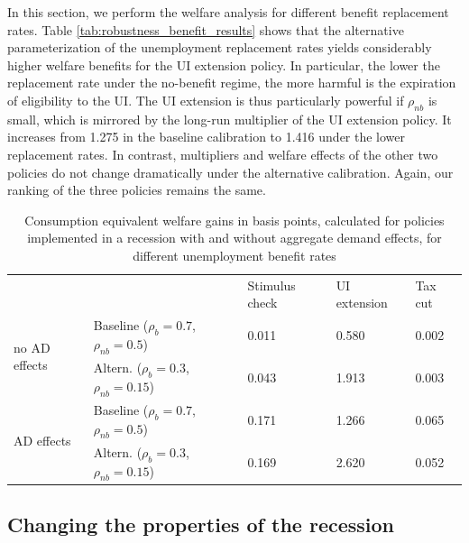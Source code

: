 \documentclass[\econtexRoot/HAFiscal]{subfiles}
\begin{document}
In this section, we perform the welfare analysis for different benefit replacement rates. Table \ref{tab:robustness_benefit_results} shows that the alternative parameterization of the unemployment replacement rates yields considerably higher welfare benefits for the UI extension policy. In particular, the lower the replacement rate under the no-benefit regime, the more harmful is the expiration of eligibility to the UI. The UI extension is thus particularly powerful if $\rho_{nb}$ is small, which is mirrored by the long-run multiplier of the UI extension policy. It increases from 1.275 in the baseline calibration to 1.416 under the lower replacement rates. In contrast, multipliers and welfare effects of the other two policies do not change dramatically under the alternative calibration. Again, our ranking of the three policies remains the same.


\begin{table}[]
  \begin{center}
    \begin{tabular}{@{}lllll@{}}
      \toprule
      &                    & Stimulus check & UI extension & Tax cut \\ \cmidrule(l){1-5} 
      \multirow{2}{*}{no AD effects} 	& Baseline  ($\rho_{b}=0.7$, $\rho_{nb}=0.5$) 		& 0.011          & 0.580        & 0.002   \\
      & Altern.  ($\rho_{b}=0.3$, $\rho_{nb}=0.15$) 	& 0.043          & 1.913        & 0.003   \\ \cmidrule(l){1-5} 
      \multirow{2}{*}{AD effects}		& Baseline  ($\rho_{b}=0.7$, $\rho_{nb}=0.5$)    	& 0.171          & 1.266        & 0.065   \\
      & Altern.  ($\rho_{b}=0.3$, $\rho_{nb}=0.15$)    & 0.169          & 2.620        & 0.052   \\ \cmidrule(l){1-5} 
    \end{tabular}
    \caption{Consumption equivalent welfare gains in basis points, calculated for policies implemented in a recession with and without aggregate demand effects, for different unemployment benefit rates}
    \notinsubfile{\label{tab:robustness_benefit_results}}
  \end{center}
\end{table}




\FloatBarrier
\hypertarget{changing-the-properties-of-the-recession}{}
\subsection{Changing the properties of the recession}
\end{document}
